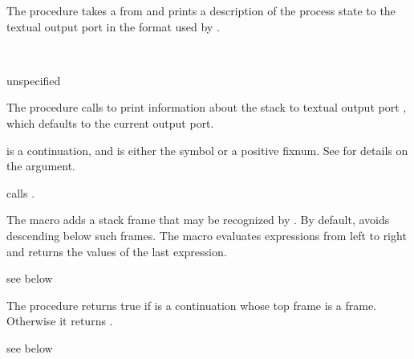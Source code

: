 The  procedure takes a  from
 and prints a description of the process state
to the textual output port  in the format used by .

\begin{procedure}
  \\
  \strut
\end{procedure}
\returns{} unspecified

The  procedure calls  to print information
about the stack to textual output port , which defaults to the current
output port.

 is a continuation, and  is either the symbol
 or a positive fixnum.
See \hyperlink{walk-stack}{} for details on the
 argument.

 calls .

\begin{syntax}
\end{syntax}
\expandsto{}

The  macro adds a stack frame that may be recognized
by .
By default,  avoids descending below such frames.
The  macro evaluates expressions   \etc from
left to right and returns the values of the last expression.

\begin{procedure}
\end{procedure}
\returns{} see below

The  procedure returns true if  is a continuation
whose top frame is a  frame.
Otherwise it returns .

\begin{procedure}
\end{procedure}
\returns{} see below

